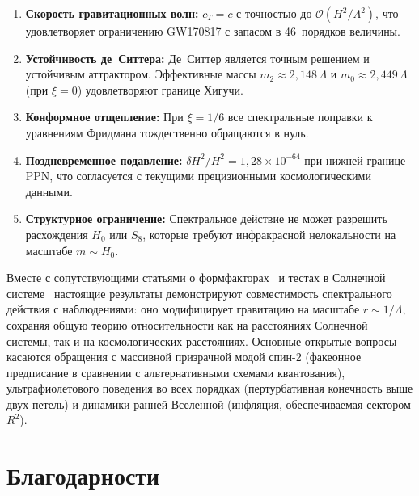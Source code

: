\documentclass[12pt,a4paper]{article}
\newcommand{\order}{\mathcal{O}}
\newcommand{\Lam}{\Lambda}
\theoremstyle{plain}
\theoremstyle{definition}
\begin{document}
\begin{enumerate}
  \item \textbf{Скорость гравитационных волн:}  $c_T = c$ с точностью до
    $\order(H^2/\Lam^2)$, что удовлетворяет ограничению GW170817
    с запасом в 46~порядков величины.

  \item \textbf{Устойчивость де~Ситтера:}  Де~Ситтер является точным
    решением и устойчивым аттрактором.  Эффективные массы
    $m_2 \approx 2{,}148\,\Lam$ и $m_0 \approx 2{,}449\,\Lam$ (при
    $\xi = 0$) удовлетворяют границе Хигучи.

  \item \textbf{Конформное отщепление:}  При $\xi = 1/6$ все спектральные
    поправки к уравнениям Фридмана тождественно обращаются в нуль.

  \item \textbf{Поздневременное подавление:}
    $\delta H^2/H^2 = 1{,}28 \times 10^{-64}$ при нижней границе PPN,
    что согласуется с текущими прецизионными
    космологическими данными.

  \item \textbf{Структурное ограничение:}  Спектральное действие не может разрешить
    расхождения $H_0$ или $S_8$, которые требуют инфракрасной
    нелокальности на масштабе $m \sim H_0$.
\end{enumerate}

Вместе с сопутствующими статьями о
формфакторах~\cite{Alfyorov:2026ff} и тестах в Солнечной
системе~\cite{Alfyorov:2026ss} настоящие результаты демонстрируют
совместимость спектрального действия с наблюдениями: оно модифицирует гравитацию на масштабе $r \sim 1/\Lam$, сохраняя общую
теорию относительности как на расстояниях Солнечной системы, так и на
космологических расстояниях.  Основные открытые вопросы касаются
обращения с массивной призрачной модой спин-2 (факеонное предписание
в сравнении с альтернативными схемами квантования), ультрафиолетового
поведения во всех порядках (пертурбативная конечность выше двух петель)
и динамики ранней Вселенной (инфляция, обеспечиваемая сектором $R^2$).

\section*{Благодарности}

\end{document}
